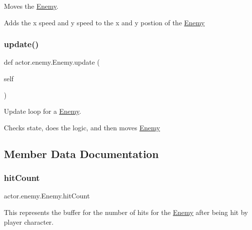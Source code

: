 Moves the \hyperlink{classactor_1_1enemy_1_1_enemy}{Enemy}. 

Adds the x speed and y speed to the x and y postion of the \hyperlink{classactor_1_1enemy_1_1_enemy}{Enemy} \mbox{\label{classactor_1_1enemy_1_1_enemy_a5a7ad5761870721d959d491b33eb4908}} 
\subsubsection{\texorpdfstring{update()}{update()}}
{\footnotesize\ttfamily def actor.\+enemy.\+Enemy.\+update (\begin{DoxyParamCaption}\item[{}]{self }\end{DoxyParamCaption})}



Update loop for a \hyperlink{classactor_1_1enemy_1_1_enemy}{Enemy}. 

Checks state, does the logic, and then moves \hyperlink{classactor_1_1enemy_1_1_enemy}{Enemy} 

\subsection{Member Data Documentation}
\mbox{\label{classactor_1_1enemy_1_1_enemy_aaa23681089031060de8abdf44956b7d1}} 
\subsubsection{\texorpdfstring{hit\+Count}{hitCount}}
{\footnotesize\ttfamily actor.\+enemy.\+Enemy.\+hit\+Count}



This represents the buffer for the number of hits for the \hyperlink{classactor_1_1enemy_1_1_enemy}{Enemy} after being hit by player character. 

\mbox{\label{classactor_1_1enemy_1_1_enemy_acc0b053f7922d48e2b76b2a0341c2c0c}} 
